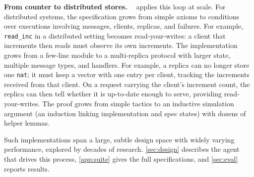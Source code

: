 \textbf{From counter to distributed stores. \ }
\sys{} applies this loop at scale.
For distributed systems, the specification grows from simple axioms to conditions over executions involving messages, clients, replicas, and failures.
For example, \texttt{read\_inc} in a distributed setting becomes read-your-writes: a client that increments then reads must observe its own increments.
The implementation grows from a few-line module to a multi-replica protocol with larger state, multiple message types, and handlers.
For example, a replica can no longer store one \texttt{nat}; it must keep a vector with one entry per client, tracking the increments received from that client. On a request carrying the client's increment count, the replica can then tell whether it is up-to-date enough to serve, providing read-your-writes.
The proof grows from simple tactics to an inductive simulation argument (an induction linking implementation and spec states) with dozens of helper lemmas.

Such implementations span a large, subtle design space with widely varying performance, explored by decades of research. \cref{sec:design} describes the agent that drives this process, \cref{app:suite} gives the full specifications, and \cref{sec:eval} reports results.







